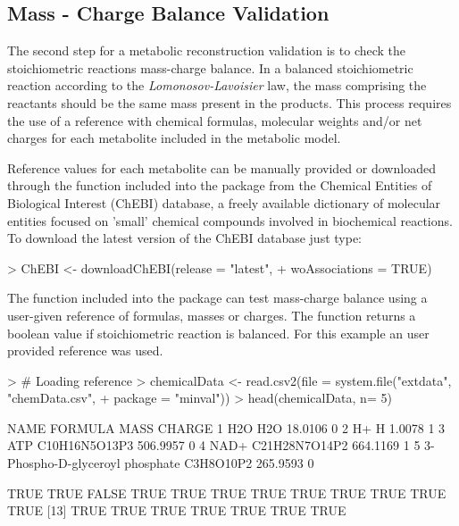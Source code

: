 \subsection{Mass - Charge Balance Validation}
The second step for a metabolic reconstruction validation is to check the stoichiometric reactions mass-charge balance. In a balanced stoichiometric reaction according to the \textit{Lomonosov-Lavoisier} law, the mass comprising the reactants should be the same mass present in the products. This process requires the use of a reference with chemical formulas, molecular weights and/or net charges for each metabolite included in the metabolic model.

Reference values for each metabolite can be manually provided or downloaded through the  function included into the  package from the Chemical Entities of Biological Interest (ChEBI) database, a freely available dictionary of molecular entities focused on 'small' chemical compounds involved in biochemical reactions. To download the latest version of the ChEBI database just type:
\begin{Schunk}
\begin{Sinput}
> ChEBI <- downloadChEBI(release = "latest", 
+                        woAssociations = TRUE)
\end{Sinput}
\end{Schunk}
The  function included into the  package can test mass-charge balance using a user-given reference of formulas, masses or charges. The  function returns a boolean value  if stoichiometric reaction is balanced. For this example an user provided reference was used.
\begin{Schunk}
\begin{Sinput}
> # Loading reference
> chemicalData <- read.csv2(file = system.file("extdata", "chemData.csv", 
+                                              package = "minval"))
> head(chemicalData, n= 5)
\end{Sinput}
\begin{Soutput}
                             NAME       FORMULA     MASS CHARGE
1                             H2O           H2O  18.0106      0
2                              H+             H   1.0078      1
3                             ATP C10H16N5O13P3 506.9957      0
4                            NAD+ C21H28N7O14P2 664.1169      1
5 3-Phospho-D-glyceroyl phosphate     C3H8O10P2 265.9593      0
\end{Soutput}
\begin{Soutput}
 [1]  TRUE  TRUE FALSE  TRUE  TRUE  TRUE  TRUE  TRUE  TRUE  TRUE  TRUE  TRUE
[13]  TRUE  TRUE  TRUE  TRUE  TRUE  TRUE  TRUE
\end{Soutput}
\end{Schunk}
